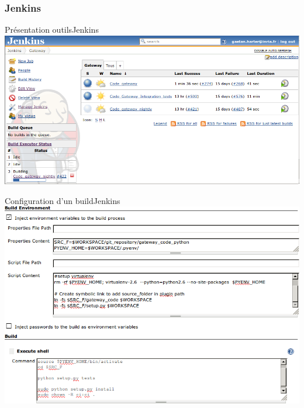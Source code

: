 \documentclass[9pt]{beamer}
\begin{document}
\subsubsection{Jenkins}
\begin{frame}{Présentation outils}{Jenkins}
  \includegraphics[width=\linewidth]{images/jenkins}
\end{frame}

\begin{frame}{Configuration d'un build}{Jenkins}
  \includegraphics[width=\linewidth]{images/build_configuration}
\end{frame}
\end{document}

